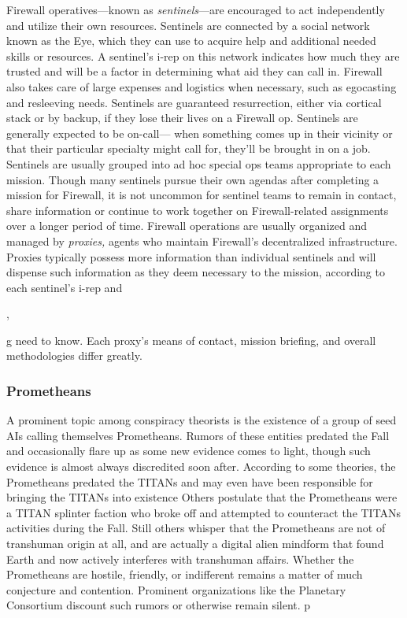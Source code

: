Firewall operatives—known as \textit{sentinels}—are encouraged
to act independently and utilize their own
resources. Sentinels are connected by a social network 
known as the Eye, which they can use to acquire help 
and additional needed skills or resources. A sentinel's 
i-rep on this network indicates how much they are 
trusted and will be a factor in determining what 
aid they can call in. Firewall also takes care of large 
expenses and logistics when necessary, such as egocasting
and resleeving needs. Sentinels are guaranteed
resurrection, either via cortical stack or by backup, if 
they lose their lives on a Firewall op.
Sentinels are generally expected to be on-call—
when something comes up in their vicinity or that 
their particular specialty might call for, they'll be 
brought in on a job. Sentinels are usually grouped into 
ad hoc special ops teams appropriate to each mission. 
Though many sentinels pursue their own agendas 
after completing a mission for Firewall, it is not uncommon
for sentinel teams to remain in contact, share
information or continue to work together on Firewall-related
assignments over a longer period of time.
Firewall operations are usually organized and 
managed by \textit{proxies,} agents who maintain Firewall's 
decentralized infrastructure. Proxies typically possess 
more information than individual sentinels and will 
dispense such information as they deem necessary 
to the mission, according to each sentinel's i-rep and 

,

g
need to know. Each proxy's means of contact, mission 
briefing, and overall methodologies differ greatly.

\subsubsection{Prometheans}

A prominent topic among conspiracy theorists is the 
existence of a group of seed AIs calling themselves 
Prometheans. Rumors of these entities predated the 
Fall and occasionally flare up as some new evidence 
comes to light, though such evidence is almost always 
discredited soon after. According to some theories, the 
Prometheans predated the TITANs and may even have 
been responsible for bringing the TITANs into existence
Others postulate that the Prometheans were a
TITAN splinter faction who broke off and attempted 
to counteract the TITANs activities during the Fall. 
Still others whisper that the Prometheans are not of 
transhuman origin at all, and are actually a digital 
alien mindform that found Earth and now actively 
interferes with transhuman affairs. Whether the Prometheans
are hostile, friendly, or indifferent remains a
matter of much conjecture and contention. Prominent 
organizations like the Planetary Consortium discount 
such rumors or otherwise remain silent.
p

